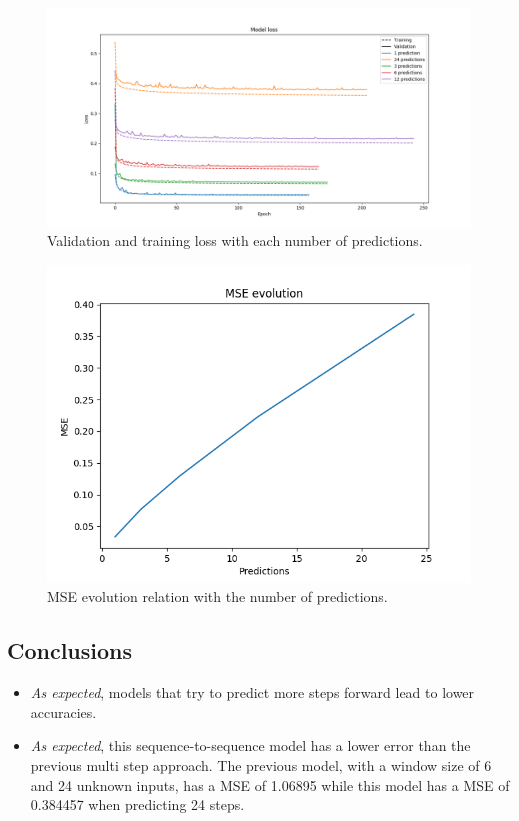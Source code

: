 \documentclass[]{article}
\begin{document}
	\begin{figure}[H]
		\centering
		\includegraphics[width=\textwidth]{seq2seq_1}
		\caption{Validation and training loss with each number of predictions.}
		\label{f:seq2seq_1}
	\end{figure}
	
	\begin{figure}[H]
		\centering
		\includegraphics[width=\textwidth]{seq2seq_2}
		\caption{MSE evolution relation with the number of predictions.}
		\label{f:seq2seq_2}
	\end{figure}
	
	\subsection{Conclusions}
	
	\begin{itemize}
		\item \emph{As expected}, models that try to predict more steps forward lead to lower accuracies.
		\item \emph{As expected}, this sequence-to-sequence model has a lower error than the previous multi step approach. The previous model, with a window size of 6 and 24 unknown inputs, has a MSE of 1.06895 while this model has a MSE of 0.384457 when predicting 24 steps.
	\end{itemize}
\end{document}
